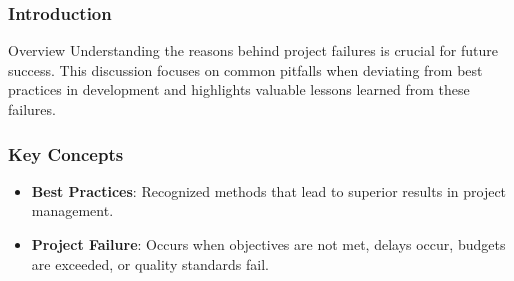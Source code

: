 \documentclass[aspectratio=169]{beamer}
\begin{document}
\begin{frame}[fragile]
    \frametitle{Introduction}
    \begin{block}{Overview}
        Understanding the reasons behind project failures is crucial for future success. This discussion focuses on common pitfalls when deviating from best practices in development and highlights valuable lessons learned from these failures.
    \end{block}
\end{frame}

\begin{frame}[fragile]
    \frametitle{Key Concepts}
    \begin{itemize}
        \item \textbf{Best Practices}: Recognized methods that lead to superior results in project management.
        \item \textbf{Project Failure}: Occurs when objectives are not met, delays occur, budgets are exceeded, or quality standards fail.
    \end{itemize}
\end{frame}
\end{document}
